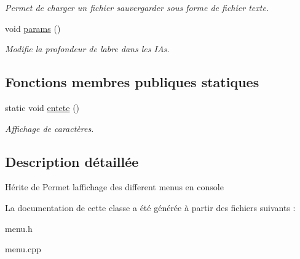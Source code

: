 \begin{DoxyCompactItemize}
\begin{DoxyCompactList}\small\item\em Permet de charger un fichier sauvergarder sous forme de fichier texte. \end{DoxyCompactList}\item 
void \hyperlink{classMenu_aceb88979ec505e8aba9924dc8206678c}{params} ()\hypertarget{classMenu_aceb88979ec505e8aba9924dc8206678c}{}\label{classMenu_aceb88979ec505e8aba9924dc8206678c}

\begin{DoxyCompactList}\small\item\em Modifie la profondeur de l\textquotesingle{}abre dans les I\+As. \end{DoxyCompactList}\end{DoxyCompactItemize}
\subsection*{Fonctions membres publiques statiques}
\begin{DoxyCompactItemize}
\item 
static void \hyperlink{classMenu_a7f575e5c439d03cef1e1a5a79a66aa54}{entete} ()\hypertarget{classMenu_a7f575e5c439d03cef1e1a5a79a66aa54}{}\label{classMenu_a7f575e5c439d03cef1e1a5a79a66aa54}

\begin{DoxyCompactList}\small\item\em Affichage de caractères. \end{DoxyCompactList}\end{DoxyCompactItemize}


\subsection{Description détaillée}
Hérite de Permet l\textquotesingle{}affichage des different menus en console 

La documentation de cette classe a été générée à partir des fichiers suivants \+:\begin{DoxyCompactItemize}
\item 
menu.\+h\item 
menu.\+cpp\end{DoxyCompactItemize}
